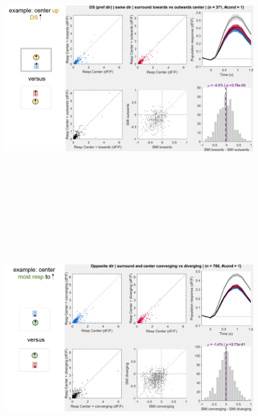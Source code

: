 \begin{figure}[H] \centering \includegraphics[width=11cm,height=11cm,keepaspectratio]{Figures/7.Results/population/sel/diagrams/20.png} 
\end{figure}

\begin{figure}[H] \centering \includegraphics[width=11cm,height=11cm,keepaspectratio]{Figures/7.Results/population/sel/diagrams/21.png} 
\end{figure}

